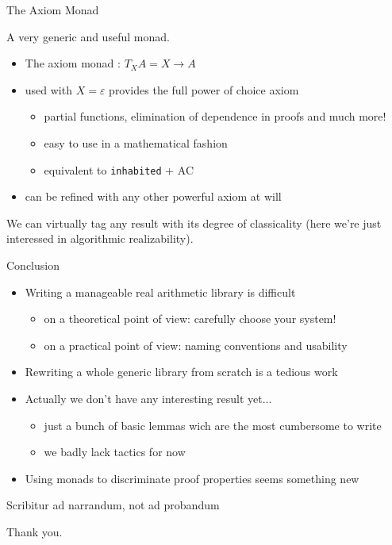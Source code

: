 \documentclass{beamer}
\begin{document}
\begin{frame}{The Axiom Monad}

A very generic and useful monad.

\begin{itemize}
  \item The axiom monad : $T_X A = X \rightarrow A$
  \item used with $X = \varepsilon$ provides the full power of choice axiom
  \begin{itemize}
    \item partial functions, elimination of dependence in proofs and much more!
    \item easy to use in a mathematical fashion
    \item equivalent to \texttt{inhabited} + AC
  \end{itemize}
    \item can be refined with any other powerful axiom at will

\end{itemize}

We can virtually tag any result with its degree of classicality (here we're just interessed in algorithmic realizability).

\end{frame}

\begin{frame}{Conclusion}

\begin{itemize}
  \item Writing a manageable real arithmetic library is difficult
  \begin{itemize}
    \item on a theoretical point of view: carefully choose your system!
    \item on a practical point of view: naming conventions and usability
  \end{itemize}
  \item Rewriting a whole generic library from scratch is a tedious work
  \item Actually we don't have any interesting result yet...
  \begin{itemize}
    \item just a bunch of basic lemmas wich are the most cumbersome to write
    \item we badly lack tactics for now
  \end{itemize}
  \item Using monads to discriminate proof properties seems something new
\end{itemize}

\end{frame}

\begin{frame}{Scribitur ad narrandum, not ad probandum}

\begin{center}
{\Huge Thank you.}
\end{center}

\end{frame}
\end{document}

